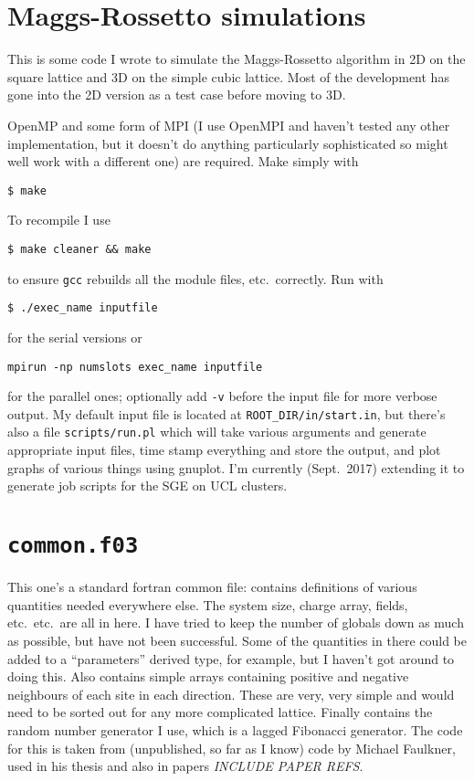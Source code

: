 \documentclass{article}
\begin{document}
\section*{Maggs-Rossetto simulations}

This is some code I wrote to simulate the Maggs-Rossetto algorithm in 2D on the square lattice and 3D on the simple cubic lattice.
Most of the development has gone into the 2D version as a test case before moving to 3D.

OpenMP and some form of MPI (I use OpenMPI and haven't tested any other implementation, but it doesn't do anything particularly sophisticated so might well work with a different one) are required.
Make simply with
\begin{verbatim}
$ make
\end{verbatim}
To recompile I use \begin{verbatim}
$ make cleaner && make
\end{verbatim}
to ensure \texttt{gcc} rebuilds all the module files, etc.\ correctly.
Run with
\begin{verbatim}
$ ./exec_name inputfile
\end{verbatim}
for the serial versions or
\begin{verbatim}
mpirun -np numslots exec_name inputfile
\end{verbatim}
for the parallel ones; optionally add \texttt{-v} before the input file for more verbose output.
My default input file is located at \texttt{ROOT{\_}DIR/in/start.in}, but there's also a file \texttt{scripts/run.pl} which will take various arguments and generate appropriate input files, time stamp everything and store the output, and plot graphs of various things using gnuplot.
I'm currently (Sept.\ 2017) extending it to generate job scripts for the SGE on UCL clusters.

\section*{\texttt{common.f03}}

This one's a standard fortran common file: contains definitions of various quantities needed everywhere else.
The system size, charge array, fields, etc.\ etc.\ are all in here.
I have tried to keep the number of globals down as much as possible, but have not been successful.
Some of the quantities in there could be added to a ``parameters'' derived type, for example, but I haven't got around to doing this.
Also contains simple arrays containing positive and negative neighbours of each site in each direction.
These are very, very simple and would need to be sorted out for any more complicated lattice.
Finally contains the random number generator I use, which is a lagged Fibonacci generator.
The code for this is taken from (unpublished, so far as I know) code by Michael Faulkner, used in his thesis and also in papers \emph{INCLUDE PAPER REFS}.
\end{document}
